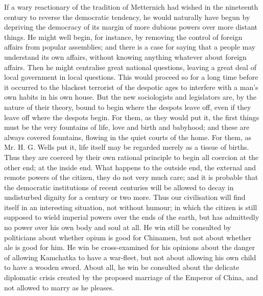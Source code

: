 \documentclass{book}
\begin{document}
If a wary reactionary of the tradition of Metternich had wished in the nineteenth century to reverse the democratic tendency, he would naturally have begun by depriving the democracy of its margin of more dubious powers over more distant things. He might well begin, for instance, by removing the control of foreign affairs from popular assemblies; and there is a case for saying that a people may understand its own affairs, without knowing anything whatever about foreign affairs. Then he might centralise great national questions, leaving a great deal of local government in local questions. This would proceed so for a long time before it occurred to the blackest terrorist of the despotic ages to interfere with a man’s own habits in his own house. But the new sociologists and legislators are, by the nature of their theory, bound to begin where the despots leave off, even if they leave off where the despots begin. For them, as they would put it, the first things must be the very fountains of life, love and birth and babyhood; and these are always covered fountains, flowing in the quiet courts of the home. For them, as Mr. H. G. Wells put it, life itself may be regarded merely as a tissue of births. Thus they are coerced by their own rational principle to begin all coercion at the other end; at the inside end. What happens to the outside end, the external and remote powers of the citizen, they do not very much care; and it is probable that the democratic institutions of recent centuries will be allowed to decay in undisturbed dignity for a century or two more. Thus our civilisation will find itself in an interesting situation, not without humour; in which the citizen is still supposed to wield imperial powers over the ends of the earth, but has admittedly no power over his own body and soul at all. He win still be consulted by politicians about whether opium is good for Chinamen, but not about whether ale is good for him. He win be cross-examined for his opinions about the danger of allowing Kamchatka to have a war-fleet, but not about allowing his own child to have a wooden sword. About all, he win be consulted about the delicate diplomatic crisis created by the proposed marriage of the Emperor of China, and not allowed to marry as he pleases.
\end{document}
